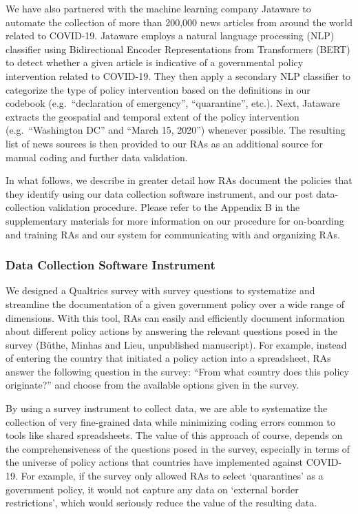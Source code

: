 \documentclass[]{article}
\begin{document}
We have also partnered with the machine learning company Jataware to automate the collection of more than 200,000 news articles from around the world related to COVID-19. Jataware employs a natural language processing (NLP) classifier using Bidirectional Encoder Representations from Transformers (BERT) to detect whether a given article is indicative of a governmental policy intervention related to COVID-19. They then apply a secondary NLP classifier to categorize the type of policy intervention based on the definitions in our codebook (e.g.~``declaration of emergency'', ``quarantine'', etc.). Next, Jataware extracts the geospatial and temporal extent of the policy intervention (e.g.~``Washington DC'' and ``March 15, 2020'') whenever possible. The resulting list of news sources is then provided to our RAs as an additional source for manual coding and further data validation.

In what follows, we describe in greater detail how RAs document the policies that they identify using our data collection software instrument, and our post data-collection validation procedure. Please refer to the Appendix B in the supplementary materials for more information on our procedure for on-boarding and training RAs and our system for communicating with and organizing RAs.

\hypertarget{data-collection-software-instrument}{%
\subsubsection*{Data Collection Software Instrument}\label{data-collection-software-instrument}}

We designed a Qualtrics survey with survey questions to systematize and streamline the documentation of a given government policy over a wide range of dimensions. With this tool, RAs can easily and efficiently document information about different policy actions by answering the relevant questions posed in the survey (Büthe, Minhas and Lieu, unpublished manuscript). For example, instead of entering the country that initiated a policy action into a spreadsheet, RAs answer the following question in the survey: ``From what country does this policy originate?'' and choose from the available options given in the survey.

By using a survey instrument to collect data, we are able to systematize the collection of very fine-grained data while minimizing coding errors common to tools like shared spreadsheets. The value of this approach of course, depends on the comprehensiveness of the questions posed in the survey, especially in terms of the universe of policy actions that countries have implemented against COVID-19. For example, if the survey only allowed RAs to select `quarantines' as a government policy, it would not capture any data on `external border restrictions', which would seriously reduce the value of the resulting data.
\end{document}
